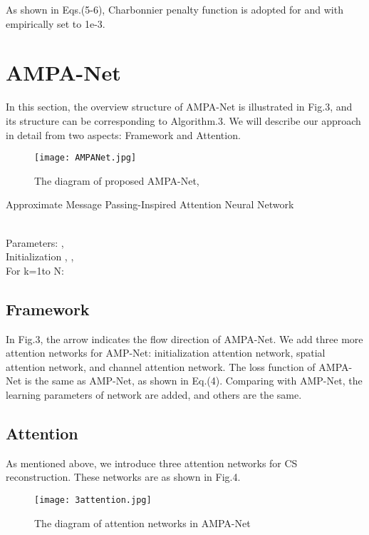 \documentclass[conference]{IEEEtran}
\begin{document}
As shown in Eqs.(5-6), Charbonnier penalty function is adopted for  and  with empirically set  to 1e-3.
\section{AMPA-Net}
In this section, the overview structure of AMPA-Net is illustrated in Fig.3, and its structure can be corresponding to Algorithm.3. We will describe our approach in detail from two aspects: Framework and  Attention.
\begin{figure*}[t]
\centering
\texttt{[image: AMPANet.jpg]} \caption{The diagram of proposed AMPA-Net,}
\label{fig:AMPANet} \end{figure*}

\begin{algorithm}
\caption{Approximate Message Passing-Inspired Attention Neural Network}
\label{alg:Approximate Message Passing-Inspired Attention Neural Network}
\begin{algorithmic}
\REQUIRE 
\ENSURE 
\\Parameters: , 
\\Initialization
\STATE , 
\STATE ,
\\For k=1to N:
       \STATE 
       \STATE 
        \STATE 
\end{algorithmic}
\end{algorithm}

\subsection{Framework}
In Fig.3, the arrow indicates the flow direction of AMPA-Net. We add three more attention networks for AMP-Net: initialization attention network, spatial attention network, and channel attention network. The loss function of AMPA-Net is the same as AMP-Net, as shown in Eq.(4). Comparing with AMP-Net, the learning parameters of network  are added, and others are the same. 
\subsection{Attention}
As mentioned above, we introduce three attention networks for CS reconstruction. These networks are as shown in Fig.4.
\begin{figure}[h]
\centering
\texttt{[image: 3attention.jpg]} \caption{ The diagram of attention networks in AMPA-Net}
\label{fig:3attention} \end{figure}
\end{document}
